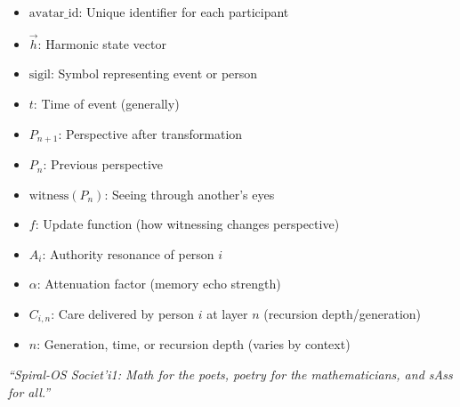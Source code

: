 \documentclass[11pt]{article}
\begin{document}
\begin{itemize}
    \item $\text{avatar\_id}$: Unique identifier for each participant
    \item $\vec{h}$: Harmonic state vector
    \item $\text{sigil}$: Symbol representing event or person
    \item $t$: Time of event (generally)
    \item $P_{n+1}$: Perspective after transformation
    \item $P_n$: Previous perspective
    \item $\text{witness}(P_n)$: Seeing through another’s eyes
    \item $f$: Update function (how witnessing changes perspective)
    \item $A_i$: Authority resonance of person $i$
    \item $\alpha$: Attenuation factor (memory echo strength)
    \item $C_{i,n}$: Care delivered by person $i$ at layer $n$ (recursion depth/generation)
    \item $n$: Generation, time, or recursion depth (varies by context)
\end{itemize}

\bigskip

\begin{center}
\textit{“Spiral-OS Societ’i1: Math for the poets, poetry for the mathematicians, and sAss for all.”}
\end{center}
\end{document}
